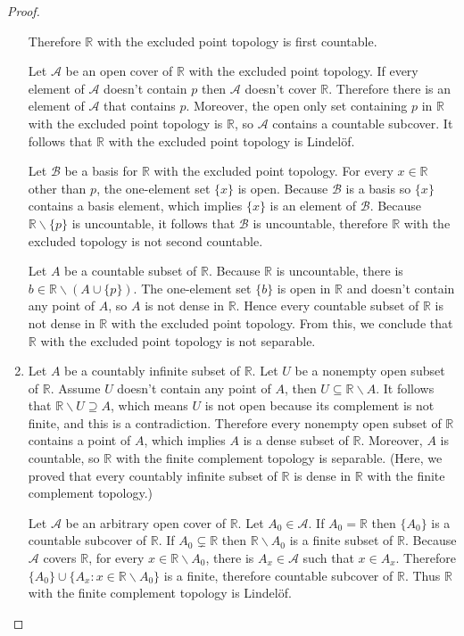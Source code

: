 \begin{proof}
\begin{enumerate}[label={(\alph*)}]
		      Therefore $\mathbb{R}$ with the excluded point topology is first countable.

		      Let $\mathscr{A}$ be an open cover of $\mathbb{R}$ with the excluded point topology. If every element of $\mathscr{A}$ doesn't contain $p$ then $\mathscr{A}$ doesn't cover $\mathbb{R}$. Therefore there is an element of $\mathscr{A}$ that contains $p$. Moreover, the open only set containing $p$ in $\mathbb{R}$ with the excluded point topology is $\mathbb{R}$, so $\mathscr{A}$ contains a countable subcover. It follows that $\mathbb{R}$ with the excluded point topology is Lindelöf.

		      Let $\mathscr{B}$ be a basis for $\mathbb{R}$ with the excluded point topology. For every $x\in\mathbb{R}$ other than $p$, the one-element set $\{ x \}$ is open. Because $\mathscr{B}$ is a basis so $\{ x \}$ contains a basis element, which implies $\{ x \}$ is an element of $\mathscr{B}$. Because $\mathbb{R}\smallsetminus\{p\}$ is uncountable, it follows that $\mathscr{B}$ is uncountable, therefore $\mathbb{R}$ with the excluded topology is not second countable.

		      Let $A$ be a countable subset of $\mathbb{R}$. Because $\mathbb{R}$ is uncountable, there is $b\in\mathbb{R}\smallsetminus (A\cup\{p\})$. The one-element set $\{b\}$ is open in $\mathbb{R}$ and doesn't contain any point of $A$, so $A$ is not dense in $\mathbb{R}$. Hence every countable subset of $\mathbb{R}$ is not dense in $\mathbb{R}$ with the excluded point topology. From this, we conclude that $\mathbb{R}$ with the excluded point topology is not separable.
		\item Let $A$ be a countably infinite subset of $\mathbb{R}$. Let $U$ be a nonempty open subset of $\mathbb{R}$. Assume $U$ doesn't contain any point of $A$, then $U\subseteq \mathbb{R}\smallsetminus A$. It follows that $\mathbb{R}\smallsetminus U \supseteq A$, which means $U$ is not open because its complement is not finite, and this is a contradiction. Therefore every nonempty open subset of $\mathbb{R}$ contains a point of $A$, which implies $A$ is a dense subset of $\mathbb{R}$. Moreover, $A$ is countable, so $\mathbb{R}$ with the finite complement topology is separable. (Here, we proved that every countably infinite subset of $\mathbb{R}$ is dense in $\mathbb{R}$ with the finite complement topology.)

		      Let $\mathscr{A}$ be an arbitrary open cover of $\mathbb{R}$. Let $A_{0}\in\mathscr{A}$. If $A_{0} = \mathbb{R}$ then $\{A_{0}\}$ is a countable subcover of $\mathbb{R}$. If $A_{0}\subsetneq \mathbb{R}$ then $\mathbb{R}\smallsetminus A_{0}$ is a finite subset of $\mathbb{R}$. Because $\mathscr{A}$ covers $\mathbb{R}$, for every $x\in \mathbb{R}\smallsetminus A_{0}$, there is $A_{x}\in\mathscr{A}$ such that $x\in A_{x}$. Therefore $\{ A_{0} \} \cup \{ A_{x} : x\in \mathbb{R}\smallsetminus A_{0} \}$ is a finite, therefore countable subcover of $\mathbb{R}$. Thus $\mathbb{R}$ with the finite complement topology is Lindelöf.


\end{enumerate}
\end{proof}

